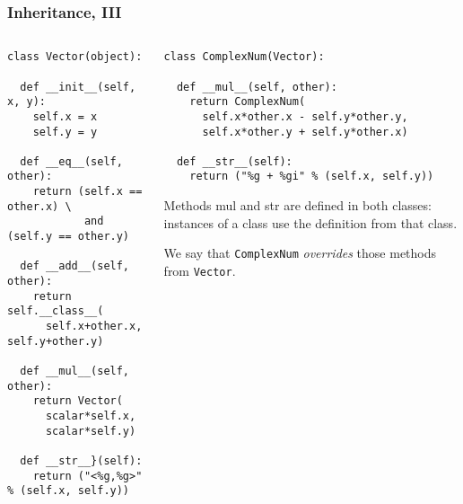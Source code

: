 \begin{frame}[fragile]\frametitle{Inheritance, III}

  \begin{columns}[t]
    \begin{column}{0.5\linewidth}
\begin{lstlisting}[basicstyle=\tiny\ttfamily,showstringspaces=false]
class Vector(object):

  def __init__(self, x, y):
    self.x = x
    self.y = y

  def __eq__(self, other):
    return (self.x == other.x) \
            and (self.y == other.y)

  def __add__(self, other):
    return self.__class__(
      self.x+other.x, self.y+other.y)

  def __mul__(self, other):
    return Vector(
      scalar*self.x,
      scalar*self.y)

  def __str__}(self):
    return ("<%g,%g>" % (self.x, self.y))
\end{lstlisting}
    \end{column}
    \begin{column}{0.5\linewidth}
\begin{lstlisting}[basicstyle=\tiny\ttfamily,showstringspaces=false]
class ComplexNum(Vector):

  def __mul__(self, other):
    return ComplexNum(
      self.x*other.x - self.y*other.y,
      self.x*other.y + self.y*other.x)

  def __str__(self):
    return ("%g + %gi" % (self.x, self.y))
\end{lstlisting}

      \small
      Methods mul and str are
      defined in both classes: instances of a class use the
      definition from that class.

      We say that \texttt{ComplexNum} \emph{overrides} those
      methods from \texttt{Vector}.
    \end{column}
  \end{columns}
\end{frame}

%
%



